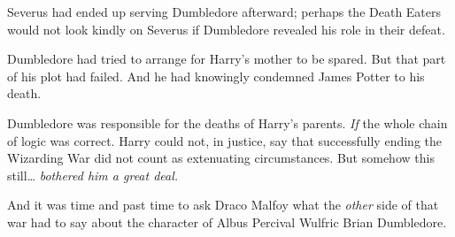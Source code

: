 Severus had ended up serving Dumbledore afterward; perhaps the Death Eaters 
would not look kindly on Severus if Dumbledore revealed his role in their 
defeat.

Dumbledore had tried to arrange for Harry's mother to be spared. But that part 
of his plot had failed. And he had knowingly condemned James Potter to his 
death.

Dumbledore was responsible for the deaths of Harry's parents. \emph{If} the 
whole chain of logic was correct. Harry could not, in justice, say that 
successfully ending the Wizarding War did not count as extenuating 
circumstances. But somehow this still{\ldots} \emph{bothered him a great deal.}

And it was time and past time to ask Draco Malfoy what the \emph{other} side of 
that war had to say about the character of Albus Percival Wulfric Brian 
Dumbledore.
